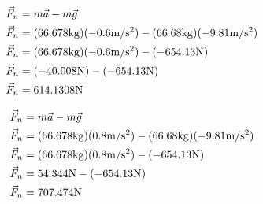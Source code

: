 \documentclass{article}
\begin{document}
\begin{multicols}{2}
    

\end{multicols}

\begin{multicols}{2}

    \begin{equation*}
        \begin{aligned}
            \vec{F}_{n} &= m \vec{a} - m \vec{g}\\
            \vec{F}_{n} &= (66.678 \unit{kg}) (-0.6\mss) - (66.68 \unit{kg})(-9.81\mss)\\
            \vec{F}_{n} &= (66.678 \unit{kg}) (-0.6\mss) -  (-654.13 \unit{N})\\
            \vec{F}_{n} &= (-40.008 \unit{N}) - (-654.13 \unit{N})\\
            \vec{F}_{n} &= 614.1308 \unit{N}
        \end{aligned}
    \end{equation*}


    \begin{equation*}
        \begin{aligned}
            \vec{F}_{n} &= m \vec{a} - m \vec{g}\\
            \vec{F}_{n} &= (66.678 \unit{kg}) (0.8\mss) - (66.68 \unit{kg})(-9.81\mss)\\
            \vec{F}_{n} &= (66.678 \unit{kg}) (0.8\mss) - (-654.13 \unit{N})\\
            \vec{F}_{n} &= 54.344 \unit{N} - (-654.13 \unit{N})\\
            \vec{F}_{n} &= 707.474 \unit{N}
        \end{aligned}
    \end{equation*}

\end{multicols}
\end{document}
